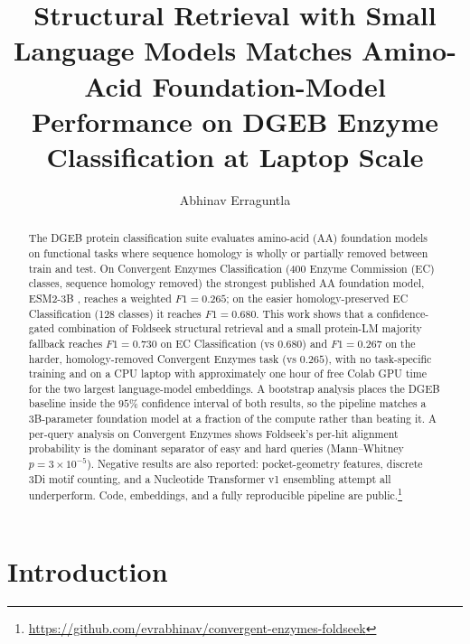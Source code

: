 \documentclass[11pt,letterpaper]{article}
\title{Structural Retrieval with Small Language Models Matches
Amino-Acid Foundation-Model Performance on DGEB Enzyme Classification
at Laptop Scale}
\author{Abhinav Erraguntla}
\affil{University of Massachusetts Amherst}
\date{}
\begin{document}
\maketitle

\begin{abstract}
The DGEB protein classification suite \citep{westroberts2024dgeb}
evaluates amino-acid (AA) foundation models on functional tasks where
sequence homology is wholly or partially removed between train and
test. On Convergent Enzymes Classification (400 Enzyme Commission
(EC) classes, sequence homology removed) the strongest published AA
foundation model, ESM2-3B \citep{lin2023esm2}, reaches a weighted
$F1 = 0.265$; on the easier homology-preserved EC Classification
(128 classes) it reaches $F1 = 0.680$. This work shows that a
confidence-gated combination of Foldseek structural retrieval
\citep{vankempen2024foldseek} and a small protein-LM majority
fallback reaches $F1 = 0.730$ on EC Classification (vs $0.680$) and
$F1 = 0.267$ on the harder, homology-removed Convergent Enzymes task
(vs $0.265$), with no task-specific training and on a CPU laptop with
approximately one hour of free Colab GPU time for the two largest
language-model embeddings. A bootstrap analysis places the DGEB
baseline inside the $95\%$ confidence interval of both results, so the
pipeline matches a 3B-parameter foundation model at a fraction of the
compute rather than beating it. A
per-query analysis on Convergent Enzymes shows Foldseek's per-hit
alignment probability is the dominant separator of easy and hard
queries (Mann--Whitney $p = 3 \times 10^{-5}$).
Negative results are also reported: pocket-geometry features,
discrete 3Di motif counting, and a Nucleotide Transformer v1
ensembling attempt all underperform. Code,
embeddings, and a fully reproducible pipeline are public.\footnote{\url{https://github.com/evrabhinav/convergent-enzymes-foldseek}}
\end{abstract}

\section{Introduction}
\end{document}
